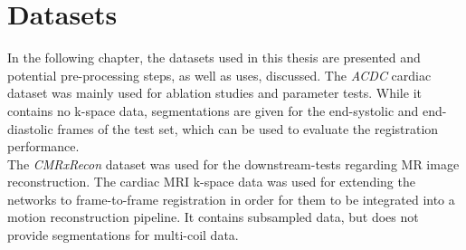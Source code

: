\documentclass[english,version-2022-01]{uzl-thesis} %
\begin{document}
\section{Datasets}	\label{Sec:Datasets}
In the following chapter, the datasets used in this thesis are presented and potential pre-processing steps, as well as uses, discussed. 
The \emph{ACDC} cardiac dataset was mainly used for ablation studies and parameter tests. While it contains no k-space data, segmentations are given for the end-systolic and end-diastolic frames of the test set, which can be used to evaluate the registration performance. \\
The \emph{CMRxRecon} dataset was used for the downstream-tests regarding MR image reconstruction. The cardiac MRI k-space data was used for extending the networks to frame-to-frame registration in order for them to be integrated into a motion reconstruction pipeline. It contains subsampled data, but does not provide segmentations for multi-coil data.

%
\end{document}
